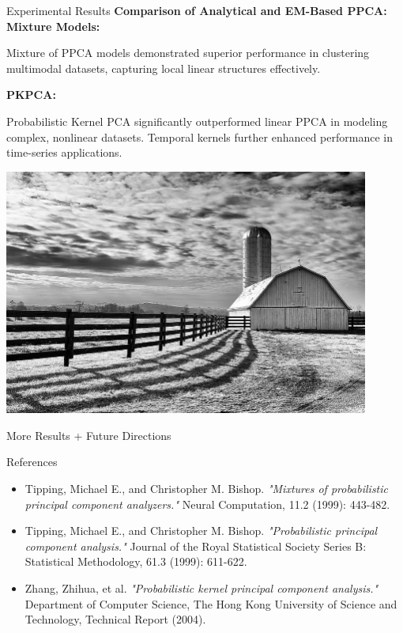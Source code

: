 \documentclass{beamer}
\begin{document}
\begin{frame}{Experimental Results}
\textbf{Comparison of Analytical and EM-Based PPCA:}
\textbf{Mixture Models:}

Mixture of PPCA models demonstrated superior performance in clustering multimodal datasets, capturing local linear structures effectively.

\textbf{PKPCA:}

Probabilistic Kernel PCA significantly outperformed linear PPCA in modeling complex, nonlinear datasets. Temporal kernels further enhanced performance in time-series applications.

\includegraphics[width=0.9\textwidth]{example_image.png} %
\end{frame}

\begin{frame}{More Results + Future Directions}

\end{frame}
\begin{frame}{References}

    \begin{itemize}
        \item Tipping, Michael E., and Christopher M. Bishop. \emph{"Mixtures of probabilistic principal component analyzers."} Neural Computation, 11.2 (1999): 443-482.
        
        \item Tipping, Michael E., and Christopher M. Bishop. \emph{"Probabilistic principal component analysis."} Journal of the Royal Statistical Society Series B: Statistical Methodology, 61.3 (1999): 611-622.
        
        \item Zhang, Zhihua, et al. \emph{"Probabilistic kernel principal component analysis."} Department of Computer Science, The Hong Kong University of Science and Technology, Technical Report (2004).
    \end{itemize}
    
    \end{frame}
\end{document}
